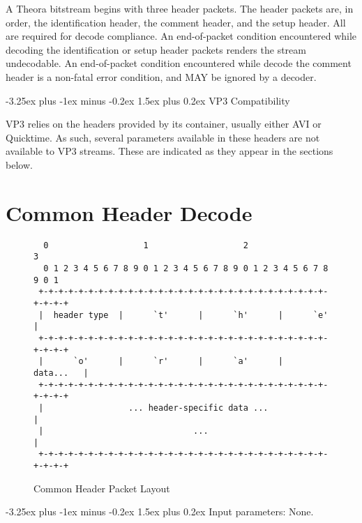 \documentclass[9pt,letterpaper]{book}
\makeatletter
\numberwithin{equation}{chapter}
\numberwithin{figure}{chapter}
\numberwithin{table}{chapter}
\renewcommand{\paragraph}{\@startsection{paragraph}{4}{0ex}%
 {-3.25ex plus -1ex minus -0.2ex}%
 {1.5ex plus 0.2ex}%
 {\normalfont\normalsize\bfseries}}
\makeatother
\begin{document}
A Theora bitstream begins with three header packets.
The header packets are, in order, the identification header, the comment
 header, and the setup header.
All are required for decode compliance.
An end-of-packet condition encountered while decoding the identification or
 setup header packets renders the stream undecodable.
An end-of-packet condition encountered while decode the comment header is a
 non-fatal error condition, and MAY be ignored by a decoder.

\paragraph{VP3 Compatibility}

VP3 relies on the headers provided by its container, usually either AVI or
 Quicktime.
As such, several parameters available in these headers are not available to VP3
 streams.
These are indicated as they appear in the sections below.

\section{Common Header Decode}
\label{sub:common-header}

\begin{figure}[Htbp]
\begin{center}
\begin{verbatim}
  0                   1                   2                   3   
  0 1 2 3 4 5 6 7 8 9 0 1 2 3 4 5 6 7 8 9 0 1 2 3 4 5 6 7 8 9 0 1 
 +-+-+-+-+-+-+-+-+-+-+-+-+-+-+-+-+-+-+-+-+-+-+-+-+-+-+-+-+-+-+-+-+
 |  header type  |      `t'      |      `h'      |      `e'      |
 +-+-+-+-+-+-+-+-+-+-+-+-+-+-+-+-+-+-+-+-+-+-+-+-+-+-+-+-+-+-+-+-+
 |      `o'      |      `r'      |      `a'      |     data...   |
 +-+-+-+-+-+-+-+-+-+-+-+-+-+-+-+-+-+-+-+-+-+-+-+-+-+-+-+-+-+-+-+-+
 |                 ... header-specific data ...                  |
 |                              ...                              |
 +-+-+-+-+-+-+-+-+-+-+-+-+-+-+-+-+-+-+-+-+-+-+-+-+-+-+-+-+-+-+-+-+
\end{verbatim}
\end{center}
\caption{Common Header Packet Layout}
\label{fig:commonheader}
\end{figure}


\paragraph{Input parameters:} None.
\end{document}
